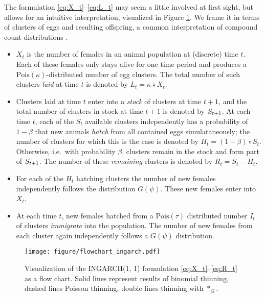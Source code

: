 \documentclass[review]{elsarticle}
\begin{document}
The formulation \eqref{eq:X_t}--\eqref{eq:L_t} may seem a little involved at first sight, but allows for an intuitive interpretation, visualized in Figure \ref{fig:ingarch_flowchart}. We frame it in terms of clusters of eggs and resulting offspring, a common interpretation of compound count distributions \cite{Neyman1939}.

\begin{itemize}
\item $X_t$ is the number of females in an animal population at (discrete) time $t$. Each of these females only stays alive for one time period and produces
 a $\text{Pois}(\kappa)$-distributed number of egg clusters. The total number of such clusters \textit{laid} at time $t$ is denoted by $L_t = \kappa \star X_t$.
\item Clusters laid at time $t$ enter into a \textit{stock} of clusters at time $t + 1$, and the total number of clusters in stock at time $t + 1$ is denoted by $S_{t + 1}$. At each time $t$, each of the $S_t$ available clusters independently has a probability of $1 - \beta$ that new animals \textit{hatch} from all contained eggs simulataneously; the number of clusters for which this is the case is denoted by $H_t = (1 - \beta) \circ S_t$. Otherwise, i.e.\ with probability $\beta$, clusters remain in the stock and form part of $S_{t + 1}$. The number of these \textit{remaining} clusters is denoted by $R_t = S_t - H_t$.
\item For each of the $H_t$ hatching clusters the number of new females independently follows the distribution $G(\psi)$. These new females enter into $X_t$.
\item At each time $t$, new females hatched from a $\text{Pois}(\tau)$ distributed number $I_t$ of clusters \textit{immigrate} into the population. The number of new females from each cluster again independently follows a $G(\psi)$ distribution.
\end{itemize}

\begin{figure}[h!]
\texttt{[image: figure/flowchart\_ingarch.pdf]}
\caption{Visualization of the INGARCH(1, 1) formulation \eqref{eq:X_t}--\eqref{eq:R_t}  as a flow chart. Solid lines represent results of binomial thinning, dashed lines Poisson thinning, double lines thinning with $*_G$.}
\label{fig:ingarch_flowchart}
\end{figure}

\end{document}
